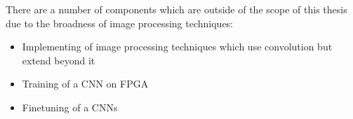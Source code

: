 There are a number of components which are outside of the scope of this thesis due to the broadness of image processing techniques:
\begin{itemize}
    \item Implementing of image processing techniques which use convolution but extend beyond it
    \item Training of a CNN on FPGA
    \item Finetuning of a CNNs
\end{itemize}